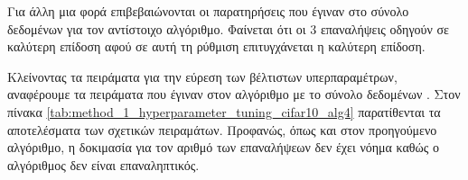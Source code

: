 \begin{table}[h]
    \begin{center}
    \end{center}
    \caption[]{\label{tab:method_1_hyperparameter_tuning_cifar10_alg3}Πίνακας που περιέχει τα πειράματα που έγιναν στο σύνολο  για την αναζήτηση υπερπαραμέτρων στον αλγόριθμο  (αλγόριθμος \ref{alg:dynam_argmax_routing}) για 30 εποχές.}
\end{table}

Για άλλη μια φορά επιβεβαιώνονται οι παρατηρήσεις που έγιναν στο σύνολο δεδομένων  για τον αντίστοιχο αλγόριθμο. Φαίνεται ότι οι 3 επαναλήψεις οδηγούν σε καλύτερη επίδοση αφού σε αυτή τη ρύθμιση επιτυγχάνεται η καλύτερη επίδοση.

Κλείνοντας τα πειράματα για την εύρεση των βέλτιστων υπερπαραμέτρων, αναφέρουμε τα πειράματα που έγιναν στον αλγόριθμο  με το σύνολο δεδομένων . Στον πίνακα \ref{tab:method_1_hyperparameter_tuning_cifar10_alg4} παρατίθενται τα αποτελέσματα των σχετικών πειραμάτων. Προφανώς, όπως και στον προηγούμενο αλγόριθμο, η δοκιμασία για τον αριθμό των επαναλήψεων δεν έχει νόημα καθώς ο αλγόριθμος δεν είναι επαναληπτικός.

